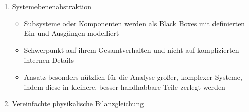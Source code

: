 \documentclass[letterpaper,10pt,german]{jupyterBook}
\begin{document}
\begin{enumerate}
\begin{itemize}
\end{itemize}

\item {} 
\sphinxAtStartPar
Systemebenenabstraktion
\begin{itemize}
\item {} 
\sphinxAtStartPar
Subsysteme oder Komponenten werden als Black Boxes mit definierten Ein\sphinxhyphen{} und Ausgängen modelliert

\item {} 
\sphinxAtStartPar
Schwerpunkt auf ihrem Gesamtverhalten und nicht auf komplizierten internen Details

\item {} 
\sphinxAtStartPar
Ansatz besonders nützlich für die Analyse großer, komplexer Systeme, indem diese in kleinere, besser handhabbare Teile zerlegt werden

\end{itemize}

\item {} 
\sphinxAtStartPar
Vereinfachte physikalische Bilanzgleichung

\end{enumerate}
\end{document}

